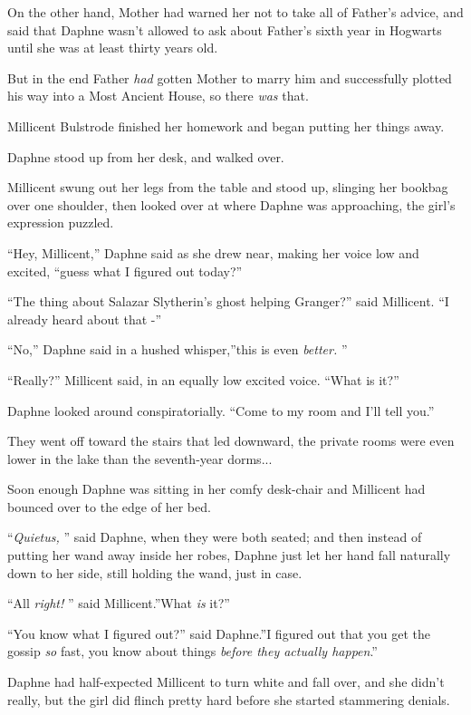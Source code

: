 On the other hand, Mother had warned her not to take all of Father's
advice, and said that Daphne wasn't allowed to ask about Father's sixth
year in Hogwarts until she was at least thirty years old.

But in the end Father \emph{had} gotten Mother to marry him and
successfully plotted his way into a Most Ancient House, so there
\emph{was} that.

Millicent Bulstrode finished her homework and began putting her things
away.

Daphne stood up from her desk, and walked over.

Millicent swung out her legs from the table and stood up, slinging her
bookbag over one shoulder, then looked over at where Daphne was
approaching, the girl's expression puzzled.

``Hey, Millicent,'' Daphne said as she drew near, making her voice low
and excited, ``guess what I figured out today?''

``The thing about Salazar Slytherin's ghost helping Granger?'' said
Millicent. ``I already heard about that -''

``No,'' Daphne said in a hushed whisper,''this is even \emph{better.} ''

``Really?'' Millicent said, in an equally low excited voice. ``What is
it?''

Daphne looked around conspiratorially. ``Come to my room and I'll tell
you.''

They went off toward the stairs that led downward, the private rooms
were even lower in the lake than the seventh-year dorms...

Soon enough Daphne was sitting in her comfy desk-chair and Millicent had
bounced over to the edge of her bed.

``\emph{Quietus,} '' said Daphne, when they were both seated; and then
instead of putting her wand away inside her robes, Daphne just let her
hand fall naturally down to her side, still holding the wand, just in
case.

``All \emph{right!} '' said Millicent.''What \emph{is} it?''

``You know what I figured out?'' said Daphne.''I figured out that you
get the gossip \emph{so} fast, you know about things \emph{before they
actually happen}.''

Daphne had half-expected Millicent to turn white and fall over, and she
didn't really, but the girl did flinch pretty hard before she started
stammering denials.

